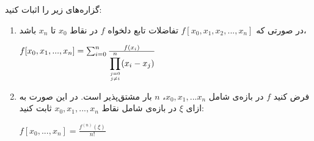 گزاره‌های زیر را اثبات کنید:
\begin{enumerate}
	\item
	در صورتی که 
	$f[x_0,x_1,x_2,...,x_n]$
	تفاضلات تابع دلخواه 
	$f$
	در نقاط 
	$x_0$
	تا
	$x_n$
	باشد،
	
	
	$f[x_0,x_1,...,x_n] = \sum_{i=0}^{n}\frac{f(x_i)}{ \displaystyle  \prod_{j=0 \atop j\neq i}^{n}(x_i - x_j)}$
	
	\item
	فرض کنید 
	$f$
	در بازه‌ی شامل 
	$x_0,x_1,...x_n$،
	$n$
	بار مشتق‌پذیر است. در این صورت به ازای 
	$\xi$
	در بازه‌ی شامل نقاط
	$x_0,x_1,...,x_n$
	ثابت کنید:
	
	\begin{center}
		$f[x_0,...,x_n] = \frac{f^{(n)}(\xi)}{n!}$
	\end{center}
\end{enumerate}


